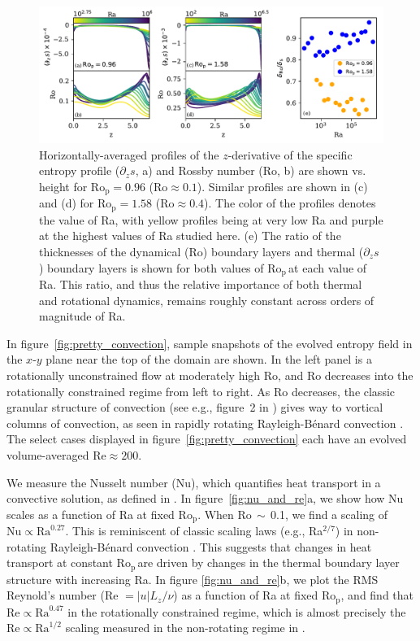\documentclass[twocolumn, amsmath, amsfonts, amssymb]{aastex62}
\newcommand{\RB}{Rayleigh-B\'{e}nard }
\newcommand{\pro}{\ensuremath{\text{Ro}_{\text{p}}}}
\begin{document}
\begin{figure}[ht!]
    \includegraphics[width=\textwidth]{boundary_layers.pdf}
    \caption{Horizontally-averaged profiles of the $z$-derivative of 
    the specific entropy profile ($\partial_z s$, a) and Rossby number (Ro, b) 
    are shown vs. height for $\pro = 0.96$ ($\text{Ro} \approx 0.1$). 
    Similar profiles are shown in (c) and (d) for $\pro = 1.58$ ($\text{Ro} \approx 0.4$). The color of the profiles
    denotes the value of Ra, with yellow profiles being at very low Ra and purple at the highest
    values of Ra studied here.
    (e) The ratio of the thicknesses of the dynamical (Ro) boundary layers and 
    thermal ($\partial_z s$) boundary layers is shown for both values of \pro$\,$at each value of Ra.
    This ratio, and thus the relative importance of both thermal and rotational dynamics,
	remains roughly constant across orders of magnitude of Ra.
    \label{fig:profiles_and_bls} }
\end{figure}

In figure~\ref{fig:pretty_convection}, sample snapshots
of the evolved entropy field in the $x$-$y$ plane near the top of the domain are shown. 
In the left panel is a rotationally unconstrained flow at moderately high
Ro, and Ro decreases into the rotationally constrained regime from left to right.
As Ro decreases, the
classic granular structure of convection (see e.g., figure~2 in \AB) gives way to vortical
columns of convection, as seen in rapidly rotating \RB convection \citep{stellmach&all2014}.
The select cases displayed in figure~\ref{fig:pretty_convection} each have an evolved volume-averaged
$\text{Re} \approx 200$.

We measure the Nusselt number (Nu), which quantifies heat transport in a convective
solution, as defined in \AB.
In figure~\ref{fig:nu_and_re}a, we show how Nu scales as a function
of Ra at fixed \pro. When Ro$\,\sim\,$0.1,
we find a scaling of $\text{Nu} \propto \text{Ra}^{0.27}$. This is reminiscent of
classic scaling laws (e.g., Ra$^{2/7}$) in non-rotating \RB convection \citep{ahlers&all2009}.
This suggests that changes in heat transport at constant \pro$\,$are driven by
changes in the thermal boundary layer structure with increasing Ra.
In figure \ref{fig:nu_and_re}b, we plot the RMS Reynold's
number (Re $= |u| L_z / \nu$) as a function of Ra at fixed \pro, and find that 
$\text{Re} \propto \text{Ra}^{0.47}$ in the rotationally constrained regime,
which is almost precisely the $\text{Re} \propto \text{Ra}^{1/2}$ scaling measured
in the non-rotating regime in \AB.
\end{document}
